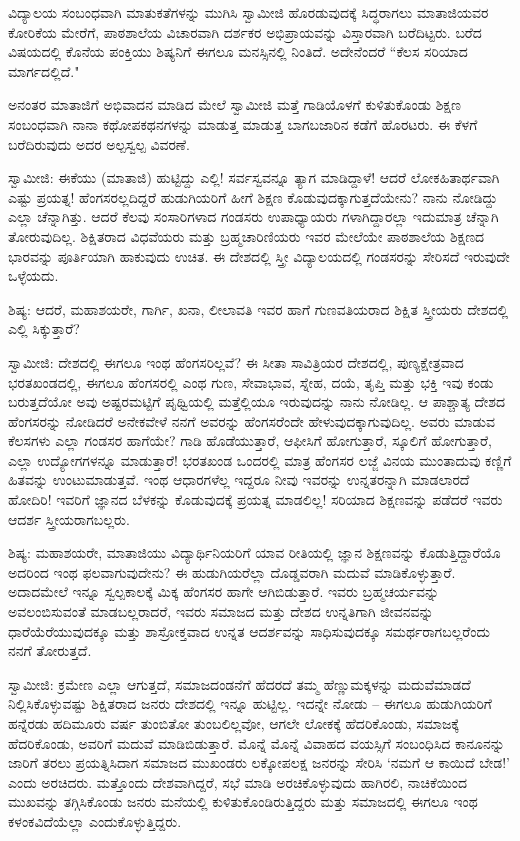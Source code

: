 ವಿದ್ಯಾಲಯ ಸಂಬಂಧವಾಗಿ ಮಾತುಕತೆಗಳನ್ನು ಮುಗಿಸಿ ಸ್ವಾಮೀಜಿ ಹೊರಡುವುದಕ್ಕೆ ಸಿದ್ಧರಾಗಲು ಮಾತಾಜಿಯವರ ಕೋರಿಕೆಯ ಮೇರೆಗೆ, ಪಾಠಶಾಲೆಯ ವಿಚಾರವಾಗಿ ದರ್ಶಕರ ಅಭಿಪ್ರಾಯವನ್ನು ವಿಸ್ತಾರವಾಗಿ ಬರೆದಿಟ್ಟರು. ಬರೆದ ವಿಷಯದಲ್ಲಿ ಕೊನೆಯ ಪಂಕ್ತಿಯು ಶಿಷ್ಯನಿಗೆ ಈಗಲೂ ಮನಸ್ಸಿನಲ್ಲಿ ನಿಂತಿದೆ. ಅದೇನೆಂದರೆ “ಕೆಲಸ ಸರಿಯಾದ ಮಾರ್ಗದಲ್ಲಿದೆ."

ಅನಂತರ ಮಾತಾಜಿಗೆ ಅಭಿವಾದನ ಮಾಡಿದ ಮೇಲೆ ಸ್ವಾಮೀಜಿ ಮತ್ತೆ ಗಾಡಿಯೊಳಗೆ ಕುಳಿತುಕೊಂಡು ಶಿಕ್ಷಣ ಸಂಬಂಧವಾಗಿ ನಾನಾ ಕಥೋಪಕಥನಗಳನ್ನು ಮಾಡುತ್ತ ಮಾಡುತ್ತ ಬಾಗಬಜಾರಿನ ಕಡೆಗೆ ಹೊರಟರು. ಈ ಕೆಳಗೆ ಬರೆದಿರುವುದು ಅದರ ಅಲ್ಪಸ್ವಲ್ಪ ವಿವರಣೆ.

ಸ್ವಾಮೀಜಿ: ಈಕೆಯು (ಮಾತಾಜಿ) ಹುಟ್ಟಿದ್ದು ಎಲ್ಲಿ! ಸರ್ವಸ್ವವನ್ನೂ ತ್ಯಾಗ ಮಾಡಿದ್ದಾಳೆ! ಆದರೆ ಲೋಕಹಿತಾರ್ಥವಾಗಿ ಎಷ್ಟು ಪ್ರಯತ್ನ! ಹೆಂಗಸರಲ್ಲದಿದ್ದರೆ ಹುಡುಗಿಯರಿಗೆ ಹೀಗೆ ಶಿಕ್ಷಣ ಕೊಡುವುದಕ್ಕಾಗುತ್ತದೆಯೇನು? ನಾನು ನೋಡಿದ್ದು ಎಲ್ಲಾ ಚೆನ್ನಾಗಿತ್ತು. ಆದರೆ ಕೆಲವು ಸಂಸಾರಿಗಳಾದ ಗಂಡಸರು ಉಪಾಧ್ಯಾಯರು ಗಳಾಗಿದ್ದಾರಲ್ಲಾ ಇದುಮಾತ್ರ ಚೆನ್ನಾಗಿ ತೋರುವುದಿಲ್ಲ. ಶಿಕ್ಷಿತರಾದ ವಿಧವೆಯರು ಮತ್ತು ಬ್ರಹ್ಮಚಾರಿಣಿಯರು ಇವರ ಮೇಲೆಯೇ ಪಾಠಶಾಲೆಯ ಶಿಕ್ಷಣದ ಭಾರವನ್ನು ಪೂರ್ತಿಯಾಗಿ ಹಾಕುವುದು ಉಚಿತ. ಈ ದೇಶದಲ್ಲಿ ಸ್ತ್ರೀ ವಿದ್ಯಾಲಯದಲ್ಲಿ ಗಂಡಸರನ್ನು ಸೇರಿಸದೆ ಇರುವುದೇ ಒಳ್ಳೆಯದು.

ಶಿಷ್ಯ: ಆದರೆ, ಮಹಾಶಯರೇ, ಗಾರ್ಗಿ, ಖನಾ, ಲೀಲಾವತಿ ಇವರ ಹಾಗೆ ಗುಣವತಿಯರಾದ ಶಿಕ್ಷಿತ ಸ್ತ್ರೀಯರು ದೇಶದಲ್ಲಿ ಎಲ್ಲಿ ಸಿಕ್ಕುತ್ತಾರೆ?

ಸ್ವಾಮೀಜಿ: ದೇಶದಲ್ಲಿ ಈಗಲೂ ಇಂಥ ಹೆಂಗಸರಿಲ್ಲವೆ? ಈ ಸೀತಾ ಸಾವಿತ್ರಿಯರ ದೇಶದಲ್ಲಿ, ಪುಣ್ಯಕ್ಷೇತ್ರವಾದ ಭರತಖಂಡದಲ್ಲಿ, ಈಗಲೂ ಹೆಂಗಸರಲ್ಲಿ ಎಂಥ ಗುಣ, ಸೇವಾಭಾವ, ಸ್ನೇಹ, ದಯೆ, ತೃಪ್ತಿ ಮತ್ತು ಭಕ್ತಿ ಇವು ಕಂಡು ಬರುತ್ತದೆಯೋ ಅವು ಅಷ್ಟರಮಟ್ಟಿಗೆ ಪೃಥ್ವಿಯಲ್ಲಿ ಮತ್ತೆಲ್ಲಿಯೂ ಇರುವುದನ್ನು ನಾನು ನೋಡಿಲ್ಲ. ಆ ಪಾಶ್ಚಾತ್ಯ ದೇಶದ ಹೆಂಗಸರನ್ನು ನೋಡಿದರೆ ಅನೇಕವೇಳೆ ನನಗೆ ಅವರನ್ನು ಹೆಂಗಸರೆಂದೇ ಹೇಳುವುದಕ್ಕಾಗುವುದಿಲ್ಲ. ಅವರು ಮಾಡುವ ಕೆಲಸಗಳು ಎಲ್ಲಾ ಗಂಡಸರ ಹಾಗೆಯೇ? ಗಾಡಿ ಹೊಡೆಯುತ್ತಾರೆ, ಆಫೀಸಿಗೆ ಹೋಗುತ್ತಾರೆ, ಸ್ಕೂಲಿಗೆ ಹೋಗುತ್ತಾರೆ, ಎಲ್ಲಾ ಉದ್ಯೋಗಗಳನ್ನೂ ಮಾಡುತ್ತಾರೆ! ಭರತಖಂಡ ಒಂದರಲ್ಲಿ ಮಾತ್ರ ಹೆಂಗಸರ ಲಜ್ಜೆ ವಿನಯ ಮುಂತಾದುವು ಕಣ್ಣಿಗೆ ಹಿತವನ್ನು ಉಂಟುಮಾಡುತ್ತವೆ. ಇಂಥ ಆಧಾರಗಳೆಲ್ಲ ಇದ್ದರೂ ನೀವು ಇವರನ್ನು ಉನ್ನತರನ್ನಾಗಿ ಮಾಡಲಾರದೆ ಹೋದಿರಿ! ಇವರಿಗೆ ಜ್ಞಾನದ ಬೆಳಕನ್ನು ಕೊಡುವುದಕ್ಕೆ ಪ್ರಯತ್ನ ಮಾಡಲಿಲ್ಲ! ಸರಿಯಾದ ಶಿಕ್ಷಣವನ್ನು ಪಡೆದರೆ ಇವರು ಆದರ್ಶ ಸ್ತ್ರೀಯರಾಗಬಲ್ಲರು.

ಶಿಷ್ಯ: ಮಹಾಶಯರೇ, ಮಾತಾಜಿಯು ವಿದ್ಯಾರ್ಥಿನಿಯರಿಗೆ ಯಾವ ರೀತಿಯಲ್ಲಿ ಜ್ಞಾನ ಶಿಕ್ಷಣವನ್ನು ಕೊಡುತ್ತಿದ್ದಾರೆಯೊ ಅದರಿಂದ ಇಂಥ ಫಲವಾಗುವುದೇನು? ಈ ಹುಡುಗಿಯರೆಲ್ಲಾ ದೊಡ್ಡವರಾಗಿ ಮದುವೆ ಮಾಡಿಕೊಳ್ಳುತ್ತಾರೆ. ಅದಾದಮೇಲೆ ಇನ್ನೂ ಸ್ವಲ್ಪಕಾಲಕ್ಕೆ ಮಿಕ್ಕ ಹೆಂಗಸರ ಹಾಗೇ ಆಗಿಬಿಡುತ್ತಾರೆ. ಇವರು ಬ್ರಹ್ಮಚರ್ಯವನ್ನು ಅವಲಂಬಿಸುವಂತೆ ಮಾಡಬಲ್ಲರಾದರೆ, ಇವರು ಸಮಾಜದ ಮತ್ತು ದೇಶದ ಉನ್ನತಿಗಾಗಿ ಜೀವನವನ್ನು ಧಾರೆಯೆರೆಯುವುದಕ್ಕೂ ಮತ್ತು ಶಾಸ್ರೋಕ್ತವಾದ ಉನ್ನತ ಆದರ್ಶವನ್ನು ಸಾಧಿಸುವುದಕ್ಕೂ ಸಮರ್ಥರಾಗಬಲ್ಲರೆಂದು ನನಗೆ ತೋರುತ್ತದೆ.

ಸ್ವಾಮೀಜಿ: ಕ್ರಮೇಣ ಎಲ್ಲಾ ಆಗುತ್ತದೆ, ಸಮಾಜದಂಡನೆಗೆ ಹೆದರದೆ ತಮ್ಮ ಹೆಣ್ಣುಮಕ್ಕಳನ್ನು ಮದುವೆಮಾಡದೆ ನಿಲ್ಲಿಸಿಕೊಳ್ಳುವಷ್ಟು ಶಿಕ್ಷಿತರಾದ ಜನರು ದೇಶದಲ್ಲಿ ಇನ್ನೂ ಹುಟ್ಟಿಲ್ಲ. ಇದನ್ನೇ ನೋಡು – ಈಗಲೂ ಹುಡುಗಿಯರಿಗೆ ಹನ್ನೆರಡು ಹದಿಮೂರು ವರ್ಷ ತುಂಬಿತೋ ತುಂಬಲಿಲ್ಲವೋ, ಆಗಲೇ ಲೋಕಕ್ಕೆ ಹೆದರಿಕೊಂಡು, ಸಮಾಜಕ್ಕೆ ಹೆದರಿಕೊಂಡು, ಅವರಿಗೆ ಮದುವೆ ಮಾಡಿಬಿಡುತ್ತಾರೆ. ಮೊನ್ನೆ ಮೊನ್ನೆ ವಿವಾಹದ ವಯಸ್ಸಿಗೆ ಸಂಬಂಧಿಸಿದ ಕಾನೂನನ್ನು ಜಾರಿಗೆ ತರಲು ಪ್ರಯತ್ನಿಸಿದಾಗ ಸಮಾಜದ ಮುಖಂಡರು ಲಕ್ಕೋಪಲಕ್ಷ ಜನರನ್ನು ಸೇರಿಸಿ ‘ನಮಗೆ ಆ ಕಾಯಿದೆ ಬೇಡ!’ ಎಂದು ಅರಚಿದರು. ಮತ್ತೊಂದು ದೇಶವಾಗಿದ್ದರೆ, ಸಭೆ ಮಾಡಿ ಅರಚಿಕೊಳ್ಳುವುದು ಹಾಗಿರಲಿ, ನಾಚಿಕೆಯಿಂದ ಮುಖವನ್ನು ತಗ್ಗಿಸಿಕೊಂಡು ಜನರು ಮನೆಯಲ್ಲಿ ಕುಳಿತುಕೊಂಡಿರುತ್ತಿದ್ದರು ಮತ್ತು ಸಮಾಜದಲ್ಲಿ ಈಗಲೂ ಇಂಥ ಕಳಂಕವಿದೆಯೆಲ್ಲಾ ಎಂದುಕೊಳ್ಳುತ್ತಿದ್ದರು.

